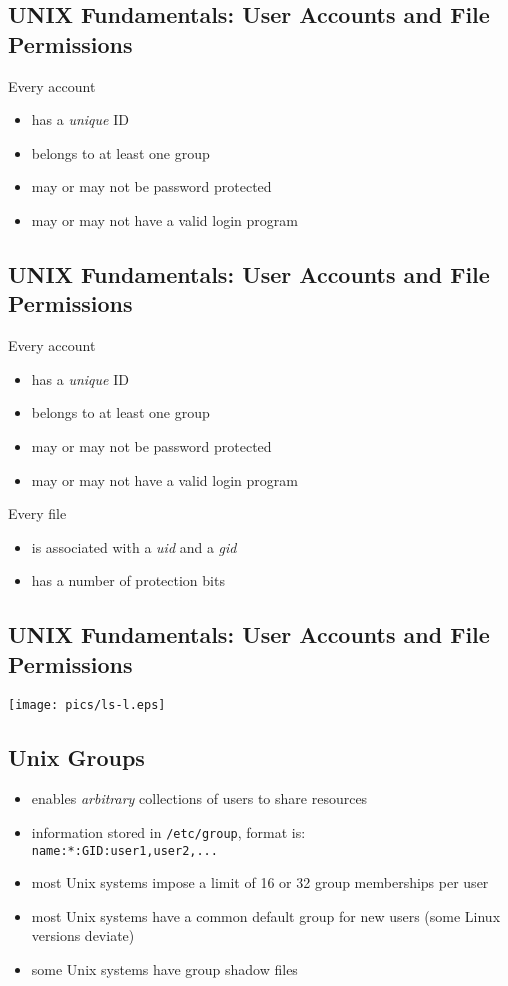 \documentclass[xga]{xdvislides}
\begin{document}
\subsection{UNIX Fundamentals: User Accounts and File Permissions}
Every account
\begin{itemize}
	\item has a {\em unique} ID
	\item belongs to at least one group
	\item may or may not be password protected
	\item may or may not have a valid login program
\end{itemize}

\subsection{UNIX Fundamentals: User Accounts and File Permissions}
Every account
\begin{itemize}
	\item has a {\em unique} ID
	\item belongs to at least one group
	\item may or may not be password protected
	\item may or may not have a valid login program
\end{itemize}
\addvspace{.5in}
Every file
\begin{itemize}
	\item is associated with a {\em uid} and a {\em gid}
	\item has a number of protection bits
\end{itemize}

\subsection{UNIX Fundamentals: User Accounts and File Permissions}
\vfill
\begin{center}
	\texttt{[image: pics/ls-l.eps]}
\end{center}
\vfill



\subsection{Unix Groups}
\begin{itemize}
	\item enables {\em arbitrary} collections of users to share resources
	\item information stored in \verb+/etc/group+, format is: \\
		\verb+name:*:GID:user1,user2,...+
	\item most Unix systems impose a limit of 16 or 32 group memberships per
		user
	\item most Unix systems have a common default group for new users (some
		Linux versions deviate)
	\item some Unix systems have group shadow files
\end{itemize}
\end{document}
